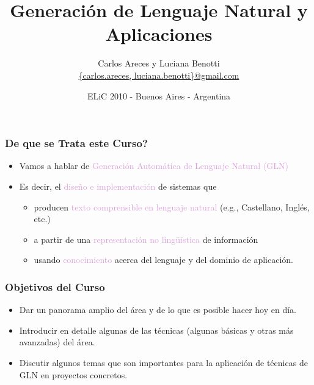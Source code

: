 \documentclass[compress,color=usenames]{beamer}
\title[GLN y Aplicaciones]{\Huge Generaci\'on de Lenguaje Natural y Aplicaciones}
\author[Areces \& Benotti]{
 Carlos Areces y Luciana Benotti\\[1ex]
\normalsize \url{{carlos.areces, luciana.benotti}@gmail.com}}
\institute[INRIA / UNC]{
INRIA Nancy Grand Est, Nancy, France\\
Universidad Nacional de C\'ordoba, C\'ordoba, Argentina}
\date{ELiC 2010 - Buenos Aires - Argentina}
\newcommand{\mH}[1]{\textcolor{Plum}{#1}}
\begin{document}
\beamerdefaultoverlayspecification{}


\begin{frame}[plain]
 \titlepage
\end{frame}

\begin{frame}
\frametitle{De que se Trata este Curso?}

\begin{itemize}
\item Vamos a hablar de \mH{Generaci\'on Autom\'atica de Lenguaje Natural (GLN)}
\item Es decir, el \mH{dise\~no e implementaci\'on} de sistemas que 
\begin{itemize}
\item producen \mH{texto comprensible en lenguaje natural} (e.g., Castellano, 
Ingl\'es, etc.)
\item a partir de una \mH{representaci\'on no ling\"u\'istica} de informaci\'on
\item usando \mH{conocimiento} acerca del lenguaje y del dominio de aplicaci\'on.
\end{itemize}

\end{itemize}

\end{frame}

\begin{frame}
\frametitle{Objetivos del Curso}

\begin{itemize}
\item Dar un panorama amplio del \'area y de lo que es posible hacer hoy en d\'ia.
\item Introducir en detalle algunas de las t\'ecnicas (algunas b\'asicas y otras 
m\'as avanzadas) del \'area. 
\item Discutir algunos temas que son importantes para la aplicaci\'on de 
t\'ecnicas de GLN en proyectos concretos.
\end{itemize}
\end{frame}
\end{document}
